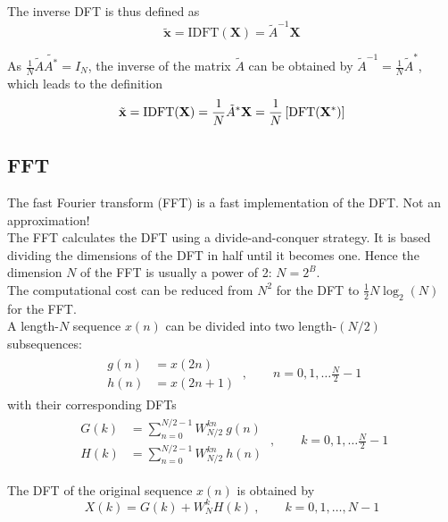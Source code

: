 The inverse DFT is thus defined as
\begin{equation*}
	\tilde{\mathbf{x}} = \text{IDFT}(\mathbf{X}) = \tilde{A}^{-1} \mathbf{X}
\end{equation*}

As $\frac{1}{N} \tilde{A} \tilde{A^*} = I_N$, the inverse of the matrix 
$\tilde{A}$ can be obtained by $\tilde{A}^{-1} = \frac{1}{N} \tilde{A}^*$, 
which leads to the definition
\begin{equation*}
	\tilde{\mathbf{x}} = \text{IDFT}(\mathbf{X}) = \frac{1}{N} \tilde{A}^* \mathbf{X} = \frac{1}{N}\left[ \operatorname{\text{DFT}}(\mathbf{X}^*) \right]
\end{equation*}

\subsection{FFT}
The fast Fourier transform (FFT) is a fast implementation of the DFT.
Not an approximation! \\

The FFT calculates the DFT using a divide-and-conquer strategy. It is based
dividing the dimensions of the DFT in half until it becomes one. Hence
the dimension $N$ of the FFT is usually a power of 2: $N = 2^B$. \\

The computational cost can be reduced from $N^2$ for the DFT to $\frac{1}{2} N \log_2 (N)$ for the FFT. \\

A length-$N$ sequence $x(n)$ can be divided into two length-$(N/2)$ subsequences:
\begin{align*}
	\begin{array}{ll}
		g(n) &= x(2n) \\
		h(n) &= x(2n+1)
	\end{array}
	\:,\qquad n = 0,1,\ldots \frac{N}{2}-1
\end{align*}
with their corresponding DFTs
\begin{align*}
	\begin{array}{ll}
		G(k) &= \sum\limits_{n=0}^{N/2-1} W_{N/2}^{kn} \: g(n) \\
		H(k) &= \sum\limits_{n=0}^{N/2-1} W_{N/2}^{kn} \: h(n)
	\end{array}
	\:,\qquad k=0,1,\ldots \frac{N}{2}-1
\end{align*}

The DFT of the original sequence $x(n)$ is obtained by
\begin{equation*}
	X(k) = G(k) + W_N^k H(k) \:,\qquad k=0,1,\ldots,N-1
\end{equation*}

